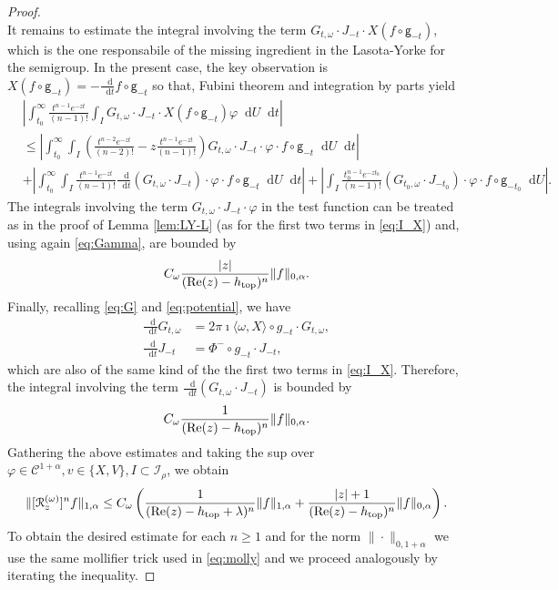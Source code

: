 \documentclass[11pt,letterpaper]{amsart}
\newcommand \cI {{\mathcal I}}
\newcommand \cR {{\mathcal R}}
\newcommand \cC {{\mathscr{C}}}
\newcommand{\geo}{\mathsf{g}}
\newcommand*{\diff}{\mathop{}\!\mathrm{d}}
\newcommand \re {{%
\operatorname{Re}
}}
\DeclareMathOperator{\topp}{top}
\theoremstyle{definition}
\begin{document}
\begin{proof}
\[\]  
It remains to estimate the integral involving the term $G_{t,\omega} \cdot J_{-t} \cdot  X(f\circ \geo_{-t})$, which is the one responsabile of the missing ingredient in the Lasota-Yorke for the semigroup. In the present case, the key observation is $X(f\circ \geo_{-t})= -\frac{\diff }{\diff  t}f\circ \geo_{-t}$ so that, Fubini theorem and integration by parts yield
\[
\begin{split}
&\left|\int_{t_0}^{\infty} \frac{ t^{n-1} e^{-z t}}{(n-1) !}\int_{I} G_{t,\omega} \cdot J_{-t} \cdot  X(f\circ \geo_{-t})\varphi \diff U \diff t\right| \\
%
&\le \left|\int_{t_0}^{\infty} \int_{I}\left( \frac{ t^{n-2} e^{-z t}}{(n-2) !}-z  \frac{ t^{n-1} e^{-z t}}{(n-1) !}\right) G_{t,\omega} \cdot J_{-t} \cdot \varphi\cdot f\circ \geo_{-t} \diff U \diff t\right|\\
%
&+\left|\int_{t_0}^{\infty} \int_{I} \frac{ t^{n-1} e^{-z t}}{(n-1) !}\frac{\diff}{\diff t}\left( G_{t,\omega} \cdot J_{-t}\right) \cdot \varphi\cdot f\circ \geo_{-t} \diff U \diff t\right|+ \left| \int_{I} \frac{ t_0^{n-1} e^{-z t_0}}{(n-1) !}\left( G_{t_0,\omega} \cdot J_{-t_0}\right) \cdot \varphi\cdot f\circ \geo_{-t_0} \diff U \right| .
\end{split}
\]
The integrals involving the term $G_{t,\omega} \cdot J_{-t} \cdot \varphi$ in the test function can be treated as in the proof of Lemma \ref{lem:LY-L} (as for the first two terms in \eqref{eq:I_X}) and, using again \eqref{eq:Gamma}, are bounded by
\[
C_\omega\frac{|z|}{(\re(z)-h_{\topp})^n}\|f\|_{0,\alpha}.
\]
Finally, recalling \eqref{eq:G} and \eqref{eq:potential}, we have
\begin{equation}\label{eq:GJ}
\begin{split}
\frac{\diff}{\diff t}G_{t,\omega} &= 2\pi \imath \langle \omega, X \rangle\circ g_{-t} \cdot G_{t,\omega},\\
%
\frac{\diff}{\diff t}J_{-t} &=\Phi^-\circ g_{-t} \cdot J_{-t},
\end{split}
\end{equation}
which are also of the same kind of the the first two terms in \eqref{eq:I_X}. Therefore, the integral involving the term $\frac{\diff}{\diff t}\left( G_{t,\omega} \cdot J_{-t}\right)$ is bounded by 
\[
C_\omega\frac{1}{(\re(z)-h_{\topp})^n}\|f\|_{0,\alpha}.
\]
Gathering the above estimates and taking the sup over $\varphi\in \cC^{1+\alpha},v\in \{X,V\}, I \subset \cI_\rho$, we obtain 
\[
\|[\cR_z^{(\omega)}]^n f\|_{1,\alpha} \le C_\omega \left(\frac{1}{ (\re(z)-h_{\topp}+\lambda)^{n}}\|f\|_{1,\alpha}+\frac{|z|+1}{(\re(z)-h_{\topp})^n}\|f\|_{0,\alpha}\right).
\]
To obtain the desired estimate for each $n \ge 1$ and for the norm $\|\cdot\|_{0,1+\alpha}$ we use the same mollifier trick used in \eqref{eq:molly} and we proceed analogously by iterating the inequality.
\end{proof}
\end{document}
